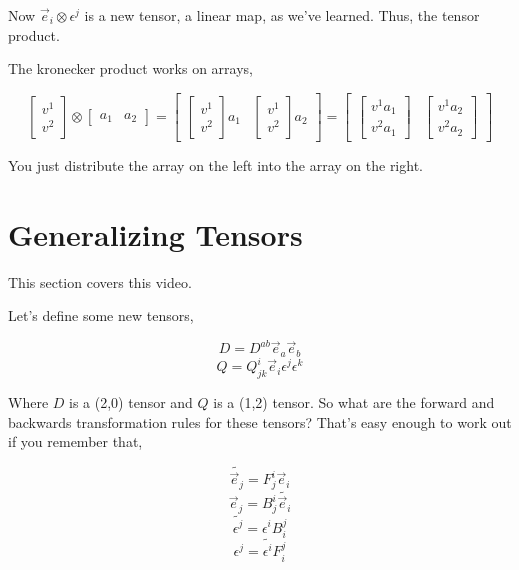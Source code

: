 \documentclass[12pt]{book}
\theoremstyle{plain}
\theoremstyle{definition}
\theoremstyle{ppart}
\theoremstyle{case}
\theoremstyle{solution}
\begin{document}
Now $\vec{e}_i \otimes \epsilon^j$ is a new tensor, a linear map, as we've learned.
Thus, the tensor product.

The kronecker product works on arrays,

\[
  \begin{bmatrix}
  v^1 \\
  v^2
  \end{bmatrix}
  \otimes
  \begin{bmatrix}
  a_1 & a_2
  \end{bmatrix}
  =
  \begin{bmatrix}
    \begin{bmatrix}
    v^1 \\
    v^2
    \end{bmatrix}
    a_1 
  & 
    \begin{bmatrix}
    v^1 \\
    v^2
    \end{bmatrix}
    a_2
  \end{bmatrix}
  =
  \begin{bmatrix}
    \begin{bmatrix}
    v^1 a_1 \\
    v^2 a_1 
    \end{bmatrix}
  & 
    \begin{bmatrix}
    v^1 a_2 \\
    v^2 a_2 
    \end{bmatrix}
  \end{bmatrix}
\]

You just distribute the array on the left into the array on the right.

\section{Generalizing Tensors}

This section covers this \cite{youtube:tensor12} video.

Let's define some new tensors,

\[ D = D^{ab} \vec{e}_a \vec{e}_b \]
\[ Q = Q^i_{jk} \vec{e}_i \epsilon^j \epsilon^k \]

Where $D$ is a (2,0) tensor and $Q$ is a (1,2) tensor.
So what are the forward and backwards transformation rules for these tensors?
That's easy enough to work out if you remember that,

\[ \widetilde{\vec{e}_j} = F^i_j \vec{e}_i \]
\[ \vec{e}_j = B^i_j \widetilde{\vec{e}_i} \]
\[ \widetilde{\epsilon^j} = \epsilon^i B^j_i \]
\[ \epsilon^j = \widetilde{\epsilon^i} F^j_i \]
\end{document}
